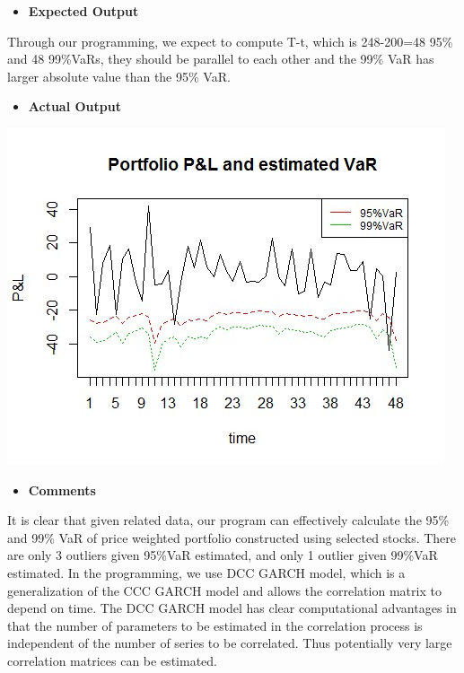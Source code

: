     \begin{itemize}
    \item \textbf{Expected Output}
    \end{itemize}
    Through our programming, we expect to compute T-t, which is 248-200=48 95\% and 48 99\%VaRs, they should be parallel to each other and the 99\% VaR has larger absolute value than the 95\% VaR.\\

    \begin{itemize}
    \item \textbf{Actual Output}
    \end{itemize}
    \begin{center}
    \includegraphics[scale=1]{5.jpg}%
    \end{center}
    \begin{itemize}
    \item \textbf{Comments}
    \end{itemize}
    It is clear that given related data, our program can effectively calculate the 95\% and 99\% VaR of price weighted portfolio constructed using selected stocks. There are only 3 outliers given 95\%VaR estimated, and only 1 outlier given 99\%VaR estimated. In the programming, we use DCC GARCH model, which is a generalization of the CCC GARCH model and allows the correlation matrix to depend on time. The DCC GARCH model has clear computational advantages in that the number of parameters to be estimated in the correlation process is independent of the number of series to be correlated. Thus potentially very large correlation matrices can be estimated.\\

